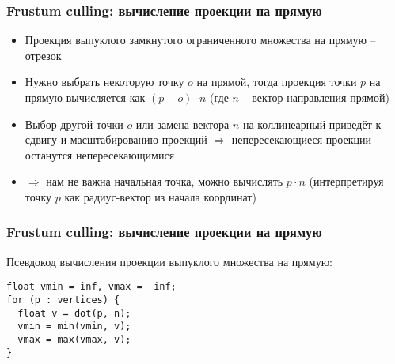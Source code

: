 \documentclass{beamer}
\begin{document}
\begin{frame}[fragile]
\frametitle{Frustum culling: вычисление проекции на прямую}
\begin{itemize}
\item Проекция выпуклого замкнутого ограниченного множества на прямую -- отрезок
\pause
\item Нужно выбрать некоторую точку \begin{math}o\end{math} на прямой, тогда проекция точки \begin{math}p\end{math} на прямую вычисляется как \begin{math}(p - o) \cdot n\end{math} (где \begin{math}n\end{math} -- вектор направления прямой)
\pause
\item Выбор другой точки \begin{math}o\end{math} или замена вектора \begin{math}n\end{math} на коллинеарный приведёт к сдвигу и масштабированию проекций \begin{math}\Rightarrow\end{math} непересекающиеся проекции останутся непересекающимися
\pause
\item \begin{math}\Rightarrow\end{math} нам не важна начальная точка, можно вычислять \begin{math}p \cdot n\end{math} (интерпретируя точку \begin{math}p\end{math} как радиус-вектор из начала координат)
\end{itemize}
\end{frame}

\begin{frame}[fragile]
\fontsize{10pt}{10pt}
\frametitle{Frustum culling: вычисление проекции на прямую}
Псевдокод вычисления проекции выпуклого множества на прямую:
\begin{verbatim}
float vmin = inf, vmax = -inf;
for (p : vertices) {
  float v = dot(p, n);
  vmin = min(vmin, v);
  vmax = max(vmax, v);
}
\end{verbatim}
\end{frame}
\end{document}
